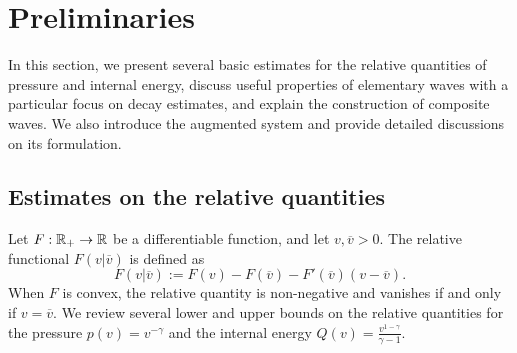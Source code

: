 \documentclass[11pt,reqno]{amsart}
\begin{document}
\section{Preliminaries}\label{sec:prelim}
    \setcounter{equation}{0}
    In this section, we present several basic estimates for the relative quantities of pressure and internal energy, discuss useful properties of elementary waves with a particular focus on decay estimates, and explain the construction of composite waves. We also introduce the augmented system and provide detailed discussions on its formulation. %
    
    
    \subsection{Estimates on the relative quantities}
   Let $F:\mathbb{R}_+\to \mathbb R$ be a differentiable function, and let $v,\overline{v}>0$. The relative functional $F(v|\overline{v})$ is defined as
    \[F(v|\overline{v}):=F(v)-F(\overline{v})-F'(\overline{v})(v-\overline{v}).\]
    When $F$ is convex, the relative quantity is non-negative and vanishes if and only if $v=\overline{v}$. We review several lower and upper bounds on the relative quantities for the pressure $p(v)=v^{-\gamma}$ and the internal energy $Q(v)=\frac{v^{1-\gamma}}{\gamma-1}$.
    
\end{document}
